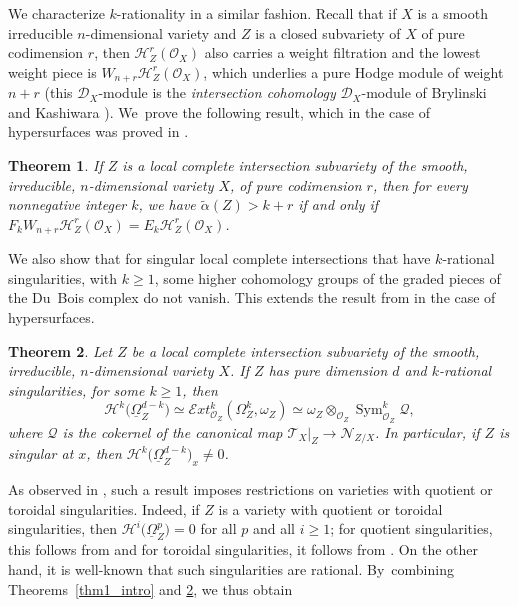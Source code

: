 \documentclass[11pt]{article}
\numberwithin{equation}{section}
\newcommand{\DXmodule}{$\cD_X$\nobreakdash-mod\-ule\xspace}
\theoremstyle{plain}
\newtheorem{thm}{Theorem}[section]
\theoremstyle{definition}
\newcommand\cD{\mathcal{D}}
\newcommand\cH{\mathcal{H}}
\newcommand\cO{\mathcal{O}}
\newcommand\cH{\mathcal{H}}
\newcommand\cO{\mathcal{O}}
\DeclareMathOperator{\Sym}{Sym}
\begin{document}
We characterize $k$-rationality in a similar fashion. Recall that if $X$ is a smooth irreducible $n$-dimensional variety and $Z$ is a closed subvariety of $X$ of pure codimension $r$, then $\cH^r_Z(\cO_X)$ also carries a weight filtration and the lowest weight piece is $W_{n+r}\cH^r_Z(\cO_X)$, which underlies a pure
Hodge module of weight $n+r$ (this \DXmodule is the \emph{intersection cohomology} \DXmodule of Brylinski and Kashiwara \cite{BK}).
We~prove the following result,
which in the case of hypersurfaces was proved in \cite{Olano}.

\begin{thm}\label{thm2_intro}
If $Z$ is a local complete intersection subvariety of the smooth, irreducible, $n$-dimensional variety $X$, of pure codimension $r$, then for every nonnegative integer
$k$, we have $\widetilde{\alpha}(Z)>k+r$ if and only if
$F_kW_{n+r}\cH^r_Z(\cO_X)=E_k\cH^r_Z(\cO_X)$.
\end{thm}

We also show that for singular local complete intersections that have $k$-rational singularities, with $k\geq 1$, some higher cohomology groups of the graded
pieces of the Du~Bois complex do not vanish. This extends the result from \cite[Th.\,1.5]{MOPW} in the case of hypersurfaces.

\begin{thm}\label{thm_nonvanishing}
Let $Z$ be a local complete intersection subvariety of the smooth, irreducible, $n$-dimensional variety $X$. If $Z$ has pure dimension $d$ and $k$-rational singularities, for some $k\geq 1$,
then
\[
\cH^k\big(\underline\Omega^{d-k}_Z\big) \simeq \mathcal{E}{xt}^k_{\cO_Z}(\Omega_Z^k,\omega_Z) \simeq \omega_Z \otimes_{\cO_Z} \Sym^k_{\mathcal O_Z} \mathcal Q,
\]
where $\mathcal Q$ is the cokernel of the canonical map $\mathcal T_X|_Z \to \mathcal N_{Z/X}$. In particular, if $Z$ is singular at $x$, then
$\cH^k\big(\underline\Omega^{d-k}_Z\big)_x\neq 0$.
\end{thm}

As observed in \cite{MOPW}, such a result imposes restrictions on varieties with quotient or toroidal singularities.
Indeed, if $Z$ is a variety with quotient or toroidal singularities, then $\cH^i\big(\underline{\Omega}_Z^p)=0$ for all $p$ and all $i\geq 1$;
for quotient singularities, this follows from \cite[\S 5]{DuBois} and for toroidal singularities, it follows from \cite[Ch.\,V.4]{GNPP}.
On the other hand, it is well-known that such singularities are rational. By~combining Theorems~\ref{thm1_intro} and \ref{thm_nonvanishing},
we thus obtain
\end{document}

